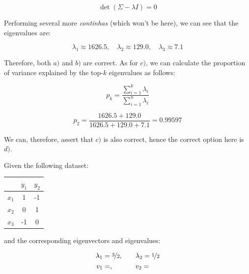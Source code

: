 \documentclass[12pt]{article}
\begin{document}
\begin{enumerate}[leftmargin=\labelsep]
  \begin{equation*}
    \det(\Sigma - \lambda I) = 0
  \end{equation*}

  Performing several more \textit{continhas} (which won't be here), we can see that the eigenvalues
  are:

  \begin{equation*}
    \lambda_1 \approx 1626.5, \quad \lambda_2 \approx 129.0, \quad \lambda_3 \approx 7.1
  \end{equation*}

  Therefore, both $a)$ and $b)$ are correct. As for $c)$, we can calculate the proportion of
  variance explained by the top-$k$ eigenvalues as follows:

  \begin{equation*}
    p_k = \frac{\sum_{i=1}^k \lambda_i}{\sum_{i=1}^n \lambda_i}
  \end{equation*}

  \begin{equation*}
    p_2 = \frac{1626.5 + 129.0}{1626.5 + 129.0 + 7.1} = 0.99597
  \end{equation*}

  We can, therefore, assert that $c)$ is also correct, hence the correct option
  here is $d)$.

  \begin{tcolorbox}[enhanced jigsaw,halign=center,colback=bg,boxrule=0pt,arc=1pt]
    \item Given the following dataset:

    \begin{table}[H]
      \centering
      \begin{tabular}{c|c|c}
              & $y_1$ & $y_2$ \\ \hline
        $x_1$ & 1     & -1    \\
        $x_2$ & 0     & 1     \\
        $x_3$ & -1    & 0
      \end{tabular}
    \end{table}

    and the corresponding eigenvectors and eigenvalues:

    \begin{equation*}
      \begin{aligned}
        \lambda_1 & = \nicefrac{3}{2}, \quad               &  & \lambda_2         = \nicefrac{1}{2} \\
        v_1       & = , \quad &  & v_2 = 
      \end{aligned}
    \end{equation*}


\end{tcolorbox}
\end{enumerate}
\end{document}
